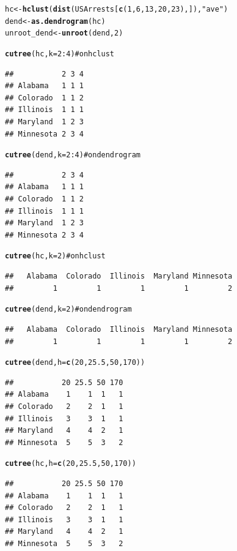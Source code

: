 \documentclass[shortnames,nojss,article]{jss}\usepackage{graphicx, color}
\makeatletter
\newcommand{\hlfunctioncall}[1]{\textcolor[rgb]{0.501960784313725,0,0.329411764705882}{\textbf{#1}}}%
\newcommand{\hlstring}[1]{\textcolor[rgb]{0.6,0.6,1}{#1}}%
\newcommand{\hlcomment}[1]{\textcolor[rgb]{0.180392156862745,0.6,0.341176470588235}{#1}}%
\newenvironment{kframe}{%
 \def\at@end@of@kframe{}%
 \ifinner\ifhmode%
  \def\at@end@of@kframe{\end{minipage}}%
  \begin{minipage}{\columnwidth}%
 \fi\fi%
 \def\FrameCommand##1{\hskip\@totalleftmargin \hskip-\fboxsep
 \colorbox{shadecolor}{##1}\hskip-\fboxsep
     \hskip-\linewidth \hskip-\@totalleftmargin \hskip\columnwidth}%
 \MakeFramed {\advance\hsize-\width
   \@totalleftmargin\z@ \linewidth\hsize
   \@setminipage}}%
 {\par\unskip\endMakeFramed%
 \at@end@of@kframe}
\newenvironment{knitrout}{}{} %
\makeatother
\begin{document}
\begin{knitrout}
\color{fgcolor}\begin{kframe}
\begin{alltt}

hc <- \hlfunctioncall{hclust}(\hlfunctioncall{dist}(USArrests[\hlfunctioncall{c}(1, 6, 13, 20, 23), ]), \hlstring{"ave"})
dend <- \hlfunctioncall{as.dendrogram}(hc)
unroot_dend <- \hlfunctioncall{unroot}(dend, 2)

\hlfunctioncall{cutree}(hc, k = 2:4)  \hlcomment{# on hclust}
\end{alltt}
\begin{verbatim}
##           2 3 4
## Alabama   1 1 1
## Colorado  1 1 2
## Illinois  1 1 1
## Maryland  1 2 3
## Minnesota 2 3 4
\end{verbatim}
\begin{alltt}
\hlfunctioncall{cutree}(dend, k = 2:4)  \hlcomment{# on dendrogram}
\end{alltt}
\begin{verbatim}
##           2 3 4
## Alabama   1 1 1
## Colorado  1 1 2
## Illinois  1 1 1
## Maryland  1 2 3
## Minnesota 2 3 4
\end{verbatim}
\begin{alltt}

\hlfunctioncall{cutree}(hc, k = 2)  \hlcomment{# on hclust}
\end{alltt}
\begin{verbatim}
##   Alabama  Colorado  Illinois  Maryland Minnesota 
##         1         1         1         1         2
\end{verbatim}
\begin{alltt}
\hlfunctioncall{cutree}(dend, k = 2)  \hlcomment{# on dendrogram}
\end{alltt}
\begin{verbatim}
##   Alabama  Colorado  Illinois  Maryland Minnesota 
##         1         1         1         1         2
\end{verbatim}
\begin{alltt}

\hlfunctioncall{cutree}(dend, h = \hlfunctioncall{c}(20, 25.5, 50, 170))
\end{alltt}
\begin{verbatim}
##           20 25.5 50 170
## Alabama    1    1  1   1
## Colorado   2    2  1   1
## Illinois   3    3  1   1
## Maryland   4    4  2   1
## Minnesota  5    5  3   2
\end{verbatim}
\begin{alltt}
\hlfunctioncall{cutree}(hc, h = \hlfunctioncall{c}(20, 25.5, 50, 170))
\end{alltt}
\begin{verbatim}
##           20 25.5 50 170
## Alabama    1    1  1   1
## Colorado   2    2  1   1
## Illinois   3    3  1   1
## Maryland   4    4  2   1
## Minnesota  5    5  3   2
\end{verbatim}
\begin{alltt}


\end{alltt}
\end{kframe}
\end{knitrout}
\end{document}
